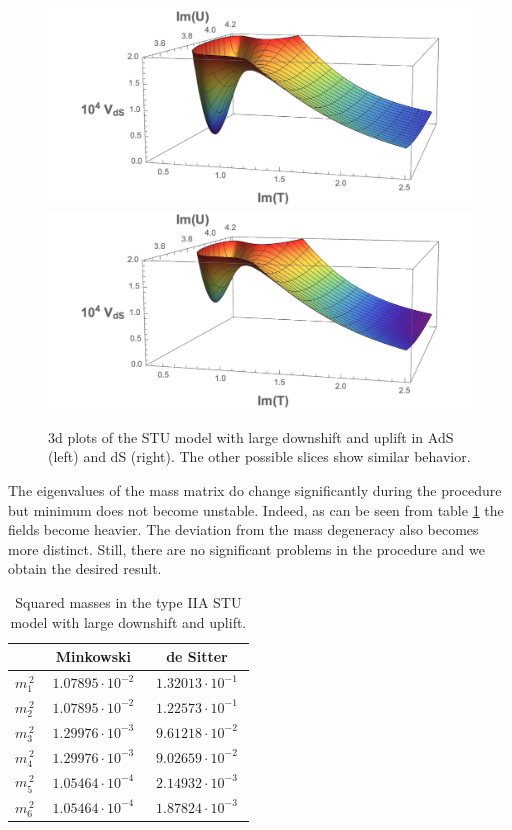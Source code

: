 \documentclass[12pt]{report}
\begin{document}
\begin{figure}[htb] 
\includegraphics[scale=0.46]{STULarge1.pdf}\qquad \includegraphics[scale=0.46]{STULarge2.pdf}
\caption{3d plots of the STU model with large downshift and uplift in AdS (left) and dS (right). The other possible slices show similar behavior. }
\label{fig:3dlargeshift}
\end{figure}
The eigenvalues of the mass matrix do change significantly during the procedure but minimum does not become unstable. Indeed, as can be seen from table \ref{tab:largemass} the fields become heavier. The deviation from the mass degeneracy also becomes more distinct. Still, there are no significant problems in the procedure and we obtain the desired result.
\begin{table}[htb]
\centering
\begin{tabular}{|c|c|c|}\hline
&  Minkowski  & de Sitter \\\hline
$m_1^{\,2} $ & $\; 1.07895 \cdot 10^{-2} \;$ & $\; 1.32013 \cdot 10^{-1} \;$  \\\hline
$m_2^{\,2} $ & $\; 1.07895 \cdot 10^{-2} \;$ & $\; 1.22573 \cdot 10^{-1} \;$ \\\hline
$m_3^{\,2} $ & $\; 1.29976 \cdot 10^{-3} \;$ & $\; 9.61218 \cdot 10^{-2} \;$ \\\hline
$m_4^{\,2} $ & $\; 1.29976 \cdot 10^{-3} \;$ & $\; 9.02659 \cdot 10^{-2} \;$ \\\hline
$m_5^{\,2} $ & $\; 1.05464 \cdot 10^{-4} \;$ & $\; 2.14932 \cdot 10^{-3} \;$ \\\hline
$m_6^{\,2} $ & $\; 1.05464 \cdot 10^{-4} \;$ & $\; 1.87824 \cdot 10^{-3} \;$ \\\hline
\end{tabular}
\caption{  Squared masses in the type IIA STU model with large downshift and uplift. }
\label{tab:largemass}
\end{table}
\end{document}
